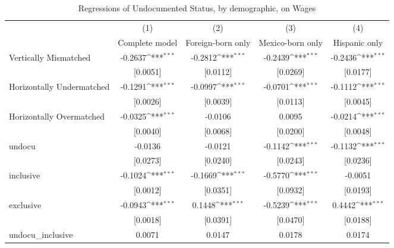 \begin{table}[htbp]\centering
\def\sym#1{\ifmmode^{#1}\else\(^{#1}\)\fi}
\caption{Regressions of Undocumented Status, by demographic, on Wages}
\begin{tabular}{l*{4}{c}}
\toprule
                    &\multicolumn{1}{c}{(1)}         &\multicolumn{1}{c}{(2)}         &\multicolumn{1}{c}{(3)}         &\multicolumn{1}{c}{(4)}         \\
                    &Complete model         &Foreign-born only         &Mexico-born only         &Hispanic only         \\
\midrule
Vertically Mismatched&     -0.2637\sym{***}&     -0.2812\sym{***}&     -0.2439\sym{***}&     -0.2436\sym{***}\\
                    &    [0.0051]         &    [0.0112]         &    [0.0269]         &    [0.0177]         \\
\addlinespace
Horizontally Undermatched&     -0.1291\sym{***}&     -0.0997\sym{***}&     -0.0701\sym{***}&     -0.1112\sym{***}\\
                    &    [0.0026]         &    [0.0039]         &    [0.0113]         &    [0.0045]         \\
\addlinespace
Horizontally Overmatched&     -0.0325\sym{***}&     -0.0106         &      0.0095         &     -0.0214\sym{***}\\
                    &    [0.0040]         &    [0.0068]         &    [0.0200]         &    [0.0048]         \\
\addlinespace
undocu              &     -0.0136         &     -0.0121         &     -0.1142\sym{***}&     -0.1132\sym{***}\\
                    &    [0.0273]         &    [0.0240]         &    [0.0243]         &    [0.0236]         \\
\addlinespace
inclusive           &     -0.1024\sym{***}&     -0.1669\sym{***}&     -0.5770\sym{***}&     -0.0051         \\
                    &    [0.0012]         &    [0.0351]         &    [0.0932]         &    [0.0193]         \\
\addlinespace
exclusive           &     -0.0943\sym{***}&      0.1448\sym{***}&     -0.5239\sym{***}&      0.4442\sym{***}\\
                    &    [0.0018]         &    [0.0391]         &    [0.0470]         &    [0.0188]         \\
\addlinespace
undocu\_inclusive    &      0.0071         &      0.0147         &      0.0178         &      0.0174         \\

\end{tabular}
\end{table}
